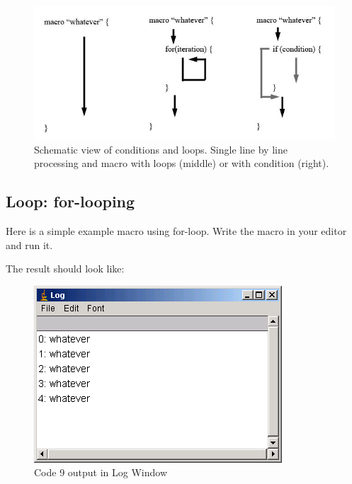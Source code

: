 \documentclass[11pt,a4paper,oneside]{report}
\begin{document}
\begin{figure}[htbp]
\begin{center}
\includegraphics[scale=0.55]{fig/fig23_1_ScriptSchemes.png}
\caption{Schematic view of conditions and loops. Single line by line processing and macro with loops (middle) or with condition (right).} \label{fig_scriptscheme}
\end{center}
\end{figure}

\subsection{Loop: for-looping}
Here is a simple example macro using for-loop. Write the macro in your editor and run it. 

The result should look like:

\begin{figure}[htbp]
\begin{center}
\includegraphics[scale=0.6]{fig/fig2311_whatever5.png}
\caption{Code 9 output in Log Window}
\label{fig_whateverOut}
\end{center}
\end{figure}
\end{document}
